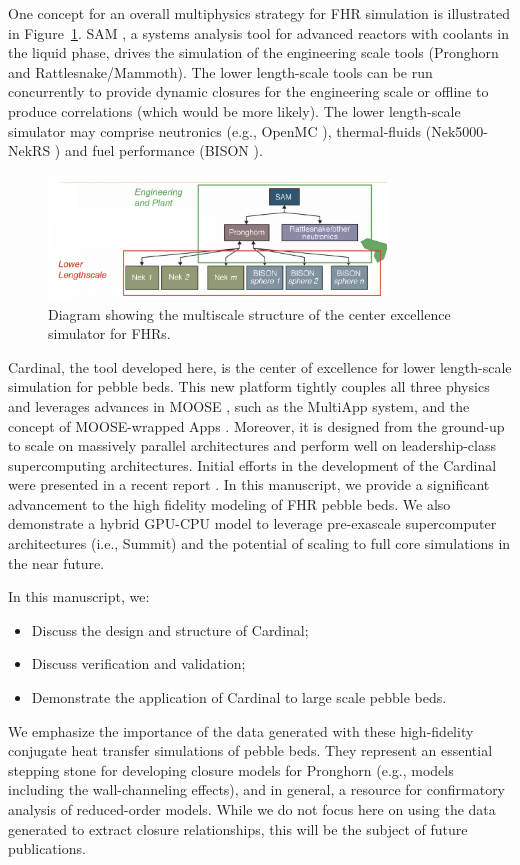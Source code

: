 One concept for an overall multiphysics strategy for FHR simulation is illustrated in Figure~\ref{f:fhr1}. SAM \cite{hu2017sam}, a systems analysis tool for advanced reactors with coolants in the liquid phase, drives the simulation of the engineering scale tools (Pronghorn and Rattlesnake/Mammoth). The lower length-scale tools can be run concurrently to provide dynamic closures for the engineering scale or offline to produce correlations (which would be more likely). The lower length-scale simulator may comprise neutronics (e.g., OpenMC \cite{romano2013openmc}), thermal-fluids (Nek5000-NekRS \cite{fischer2008}) and fuel performance (BISON \cite{hales2013triso}).

\begin{figure}[!h]
\centering
\includegraphics[clip=true,width=0.8\textwidth]{Figures/fhr_graph}
\caption{Diagram showing the multiscale structure of the center excellence simulator for FHRs.}
\label{f:fhr1}
\end{figure}

Cardinal, the tool developed here, is the center of excellence for lower length-scale simulation for pebble beds. This new platform tightly couples all three physics and leverages advances in MOOSE \cite{gaston2009moose, permann2019moose}, such as the MultiApp system, and the concept of MOOSE-wrapped Apps \cite{gastonmultiapps}. Moreover, it is designed from the ground-up to scale on massively parallel architectures and perform well on leadership-class supercomputing architectures. Initial efforts in the development of the Cardinal were presented in a recent report \cite{cardinal}. In this manuscript, we provide a significant advancement to the high fidelity modeling of FHR pebble beds. We also demonstrate a hybrid GPU-CPU model to leverage pre-exascale supercomputer architectures (i.e., Summit) and the potential of scaling to full core simulations in the near future.

In this manuscript, we:
\begin{itemize}
\item Discuss the design and structure of Cardinal;
\item Discuss verification and validation;
\item Demonstrate the application of Cardinal to large scale pebble beds.
\end{itemize}

We emphasize the importance of the data generated with these high-fidelity conjugate heat transfer simulations of pebble beds. They represent an essential stepping stone for developing closure models for Pronghorn (e.g., models including the wall-channeling effects), and in general, a resource for confirmatory analysis of reduced-order models. While we do not focus here on using the data generated to extract closure relationships, this will be the subject of future publications.
